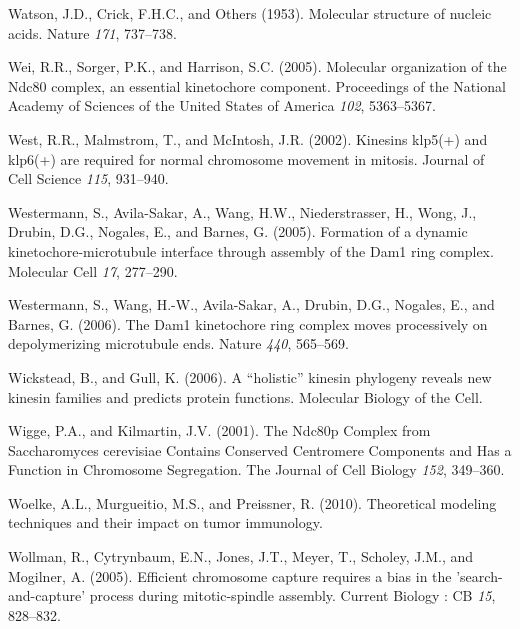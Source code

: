 \documentclass[12pt,a4paper,twoside,openright]{book}
\begin{document}
Watson, J.D., Crick, F.H.C., and Others (1953). Molecular structure of
nucleic acids. Nature \emph{171}, 737--738.

Wei, R.R., Sorger, P.K., and Harrison, S.C. (2005). Molecular
organization of the Ndc80 complex, an essential kinetochore component.
Proceedings of the National Academy of Sciences of the United States of
America \emph{102}, 5363--5367.

West, R.R., Malmstrom, T., and McIntosh, J.R. (2002). Kinesins klp5(+)
and klp6(+) are required for normal chromosome movement in mitosis.
Journal of Cell Science \emph{115}, 931--940.

Westermann, S., Avila-Sakar, A., Wang, H.W., Niederstrasser, H., Wong,
J., Drubin, D.G., Nogales, E., and Barnes, G. (2005). Formation of a
dynamic kinetochore-microtubule interface through assembly of the Dam1
ring complex. Molecular Cell \emph{17}, 277--290.

Westermann, S., Wang, H.-W., Avila-Sakar, A., Drubin, D.G., Nogales, E.,
and Barnes, G. (2006). The Dam1 kinetochore ring complex moves
processively on depolymerizing microtubule ends. Nature \emph{440},
565--569.

Wickstead, B., and Gull, K. (2006). A ``holistic'' kinesin phylogeny
reveals new kinesin families and predicts protein functions. Molecular
Biology of the Cell.

Wigge, P.A., and Kilmartin, J.V. (2001). The Ndc80p Complex from
Saccharomyces cerevisiae Contains Conserved Centromere Components and
Has a Function in Chromosome Segregation. The Journal of Cell Biology
\emph{152}, 349--360.

Woelke, A.L., Murgueitio, M.S., and Preissner, R. (2010). Theoretical
modeling techniques and their impact on tumor immunology.

Wollman, R., Cytrynbaum, E.N., Jones, J.T., Meyer, T., Scholey, J.M.,
and Mogilner, A. (2005). Efficient chromosome capture requires a bias in
the 'search-and-capture' process during mitotic-spindle assembly.
Current Biology : CB \emph{15}, 828--832.
\end{document}
